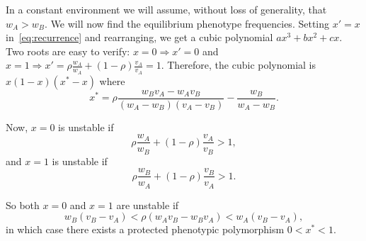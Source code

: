 \documentclass[12pt]{article} %
\begin{document}
In a constant environment we will assume, without loss of generality, that $w_A > w_B$.
We will now find the equilibrium phenotype frequencies.
Setting $x'=x$ in~\eqref{eq:recurrence} and rearranging, we get a cubic polynomial $ax^3+bx^2+cx$.
Two roots are easy to verify: $x=0 \Rightarrow x'=0$ and $x=1 \Rightarrow x'=\rho \frac{w_A}{w_A} + (1-\rho) \frac{v_A}{v_A} = 1$. 
Therefore, the cubic polynomial is $x (1-x) (x^*-x)$ where
\begin{equation}
x^* = 
\rho \frac{w_B v_A - w_A v_B}{(w_A - w_B)(v_A - v_B)} - \frac{w_B}{w_A-w_B}.
\end{equation}

Now, $x=0$ is unstable if
\begin{equation}
\rho \frac{w_A}{w_B} + (1-\rho) \frac{v_A}{v_B} > 1,
\end{equation}
and $x=1$ is unstable if
\begin{equation}
\rho \frac{w_B}{w_A} + (1-\rho) \frac{v_B}{v_A} > 1.
\end{equation}

So both $x=0$ and $x=1$ are unstable if
\begin{equation} \label{eq:protected_poly_const}
w_B(v_B - v_A) < \rho (w_A v_B - w_B v_A) < w_A(v_B - v_A),
\end{equation}
in which case there exists a protected phenotypic polymorphism $0 < x^* < 1$.
\end{document}
